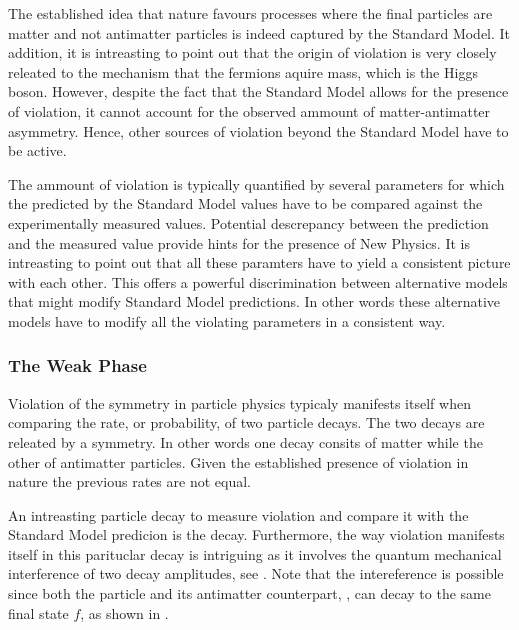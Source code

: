 The established idea that nature favours processes where the final particles are matter
and not antimatter particles is indeed captured by the Standard Model. It addition, it
is intreasting to point out that the origin of \CP violation is very closely releated
to the mechanism that the fermions aquire mass, which is the Higgs boson. However,
despite the fact that the Standard Model allows for the presence of \CP violation,
it cannot account for the observed ammount of matter-antimatter asymmetry.
Hence, other sources of \CP violation beyond the Standard Model have to be active.

The ammount of \CP violation is typically quantified by several parameters for which
the predicted by the Standard Model values have to be compared against the experimentally
measured values. Potential descrepancy between the prediction and the measured value
provide hints for the presence of New Physics. It is intreasting to point out that all these paramters have to yield
a consistent picture with each other. This offers a powerful discrimination between alternative models that might
modify Standard Model predictions. In other words these alternative models have to
modify all the \CP violating parameters in a consistent way.


\subsubsection{The Weak Phase \phis}
Violation of the \CP symmetry in particle physics typicaly manifests itself when comparing
the rate, or probability, of two particle decays. The two decays are releated by a \CP symmetry.
In other words one decay consits of matter while the other of antimatter particles.
Given the established presence of \CP violation in nature the previous rates are not equal.

An intreasting particle decay to measure \CP violation and compare it with the Standard Model
predicion is the \BsJpsiPhi decay.
Furthermore, the way \CP violation manifests itself in this parituclar decay is intriguing
as it involves the quantum mechanical interference of two decay amplitudes, see .
Note that the intereference is possible since both the \Bs particle and its antimatter counterpart,
\Bsb, can decay to the same final state $f$, as shown in .

